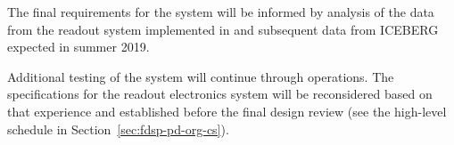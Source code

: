 The final requirements for the system will be informed by analysis of the data from the readout system implemented in  and subsequent data from ICEBERG expected in summer 2019.


Additional testing of the system will continue through  operations. The specifications for the readout electronics system will be reconsidered based on that experience and established before the  final design review (see the high-level schedule in Section~\ref{sec:fdsp-pd-org-cs}). 





